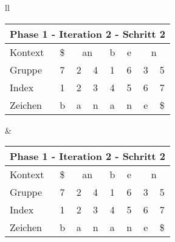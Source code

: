 \begin{table}[H]

\centering
\begin{adjustbox}{max width=\textwidth}
\begin{tabular}{ll}

\begin{tabular}{lccccccc}
\multicolumn{8}{l}{Phase 1 - Iteration 2 - Schritt 2}                                                                                                                                  \\ \hline
\multicolumn{1}{l|}{Kontext} & \multicolumn{1}{c|}{\$} & \multicolumn{2}{c|}{an}    & \multicolumn{1}{c|}{b} & \multicolumn{1}{c|}{\cellcolor[HTML]{\green}e} & \multicolumn{2}{c}{n} \\
\multicolumn{1}{l|}{Gruppe}  & \multicolumn{1}{c|}{7}  & 2 & \multicolumn{1}{c|}{4} & \multicolumn{1}{c|}{1} & \multicolumn{1}{c|}{\cellcolor[HTML]{\green}6} & 3         & 5          \\ \hline
\multicolumn{1}{l|}{Index}   & 1                       & 2 & 3                      & 4                      & 5                                              & 6         & 7          \\
\multicolumn{1}{l|}{Zeichen} & b                       & a & n                      & a                      & n                                              & e         & \$        
\end{tabular}

&

\begin{tabular}{lccccccc}
\multicolumn{8}{l}{Phase 1 - Iteration 2 - Schritt 2}                                                                                                                                          \\ \hline
\multicolumn{1}{l|}{Kontext} & \multicolumn{1}{c|}{\$} & \multicolumn{2}{c|}{an}    & \multicolumn{1}{c|}{b} & \multicolumn{1}{c|}{\cellcolor[HTML]{\green}e} & \multicolumn{2}{c}{n}         \\
\multicolumn{1}{l|}{Gruppe}  & \multicolumn{1}{c|}{7}  & 2 & \multicolumn{1}{c|}{4} & \multicolumn{1}{c|}{1} & \multicolumn{1}{c|}{\cellcolor[HTML]{\green}6} & 3                         & 5  \\ \hline
\multicolumn{1}{l|}{Index}   & 1                       & 2 & 3                      & 4                      & 5                                              & \cellcolor[HTML]{\green}6 & 7  \\
\multicolumn{1}{l|}{Zeichen} & b                       & a & n                      & a                      & n                                              & \cellcolor[HTML]{\green}e & \$
\end{tabular}


\end{tabular}
\end{adjustbox}
\end{table}
